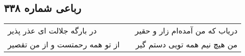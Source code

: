 \begin{center}
\section*{رباعی شماره ۳۳۸}
\label{sec:sh338}
\begin{longtable}{l p{0.5cm} r}
در بارگه جلالت ای عذر پذیر
&&
دریاب که من آمده‌ام زار و حقیر
\\
از تو همه رحمتست و از من تقصیر
&&
من هیچ نیم همه تویی دستم گیر
\\
\end{longtable}
\end{center}
